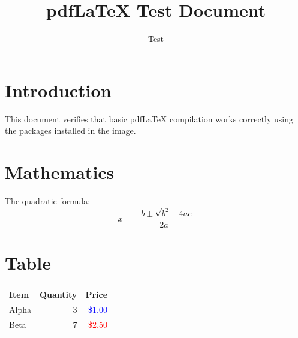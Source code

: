 \documentclass{article}
\title{pdfLaTeX Test Document}
\author{Test}
\date{}
\begin{document}
\maketitle

\section{Introduction}
This document verifies that basic pdfLaTeX compilation works correctly
using the packages installed in the image.

\section{Mathematics}
The quadratic formula:
\begin{equation}
  x = \frac{-b \pm \sqrt{b^2 - 4ac}}{2a}
\end{equation}

\section{Table}
\begin{tabular}{lrr}
  \toprule
  Item  & Quantity & Price \\
  \midrule
  Alpha & 3        & \textcolor{blue}{\$1.00} \\
  Beta  & 7        & \textcolor{red}{\$2.50} \\
  \bottomrule
\end{tabular}
\end{document}

